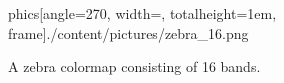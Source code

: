\begin{description}
\begin{figure}[htb]
phics[angle=270, width=\linewidth, totalheight=1em, frame]{./content/pictures/zebra_16.png}
				\caption{A zebra colormap consisting of 16 bands. }
			\end{figure}
		\end{description}

